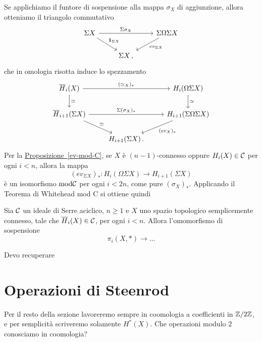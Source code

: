 Se applichiamo il funtore di sospensione alla mappa $\sigma_{X}$ di aggiunzione,
allora otteniamo il triangolo commutativo
\begin{equation*}
	\begin{tikzcd}
		\Sigma X \ar[rr, "\Sigma \sigma_{X}"] \ar[dr, "\cat{1}_{\Sigma X}"]
		& & \Sigma \Omega \Sigma X \ar[dl, "ev_{\Sigma X}"] \\
		& \Sigma X \,,
	\end{tikzcd}
\end{equation*}
che in omologia risotta induce lo spezzamento
\begin{equation*}
	\begin{tikzcd}
		\overline{H}_{i}(X) \ar[d, "\simeq"] \ar[rr, "(\simeq_{X})_{*}"]
		& & H_{i}(\Omega \Sigma X) \ar[d, "\simeq"] \\
		\overline{H}_{i+1}(\Sigma X) \ar[rr, "\Sigma (\sigma_{X})_{*}"] \ar[dr, "\simeq"]
		& & H_{i+1}(\Sigma \Omega \Sigma X)   \ar[dl, "(ev_{X})_{*}"]\\
		& H_{i+1}(\Sigma X) \,. &
	\end{tikzcd}
\end{equation*}
Per la \hyperref[ev-mod-c]{Proposizione~\ref{ev-mod-C}},
se $X$ è $(n-1)$-connesso oppure $H_{i}(X) \in \mathcal{C}$ per ogni $i < n$,
allora la mappa 
\begin{equation*}
	(ev_{\Sigma X})_{*} : H_{i}(\Omega \Sigma X) \longrightarrow H_{i+1}(\Sigma X)
\end{equation*}
è un isomorfismo $\mathrm{mod} \mathcal{C}$ per ogni $i < 2n$, come pure $(\sigma_{X})_{*}$.
Applicando il {Teorema di Whitehead mod C} si ottiene quindi
\begin{thm}
	Sia $\mathcal{C}$ un ideale di Serre aciclico, $n \ge 1$
	e $X$ uno spazio topologico semplicemente connesso,
	tale che $\overline{H}_{i}(X) \in \mathcal{C}$, per ogni $i < n$. Allora
	l'omomorfismo di sospensione
	\begin{equation*}
		\pi_{i}(X, \ast) \longrightarrow ...
	\end{equation*}
\end{thm}

Devo recuperare

\section{Operazioni di Steenrod}

Per il resto della sezione lavoreremo sempre 
in coomologia a coefficienti in ${\mathbb Z}/2{\mathbb Z}$,
e per semplicità scriveremo solamente $H^{*}(X)$.
Che operazioni modulo $2$ conosciamo in coomologia?

